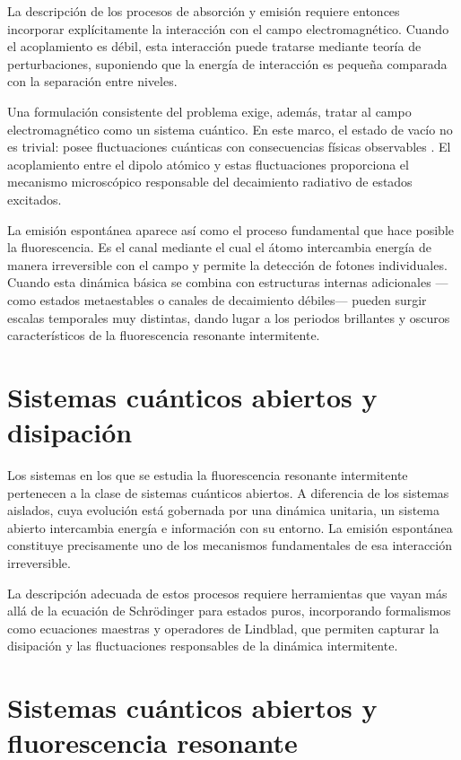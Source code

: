 \documentclass[11pt]{report}
\begin{document}
La descripción de los procesos de absorción y emisión requiere entonces incorporar explícitamente la interacción con el campo electromagnético. Cuando el acoplamiento es débil, esta interacción puede tratarse mediante teoría de perturbaciones, suponiendo que la energía de interacción es pequeña comparada con la separación entre niveles.

Una formulación consistente del problema exige, además, tratar al campo electromagnético como un sistema cuántico. En este marco, el estado de vacío no es trivial: posee fluctuaciones cuánticas con consecuencias físicas observables \cite{GlauberNobel}. El acoplamiento entre el dipolo atómico y estas fluctuaciones proporciona el mecanismo microscópico responsable del decaimiento radiativo de estados excitados.

La emisión espontánea aparece así como el proceso fundamental que hace posible la fluorescencia. Es el canal mediante el cual el átomo intercambia energía de manera irreversible con el campo y permite la detección de fotones individuales. Cuando esta dinámica básica se combina con estructuras internas adicionales —como estados metaestables o canales de decaimiento débiles— pueden surgir escalas temporales muy distintas, dando lugar a los periodos brillantes y oscuros característicos de la fluorescencia resonante intermitente.

\section{Sistemas cuánticos abiertos y disipación}

Los sistemas en los que se estudia la fluorescencia resonante intermitente pertenecen a la clase de sistemas cuánticos abiertos. A diferencia de los sistemas aislados, cuya evolución está gobernada por una dinámica unitaria, un sistema abierto intercambia energía e información con su entorno. La emisión espontánea constituye precisamente uno de los mecanismos fundamentales de esa interacción irreversible.

La descripción adecuada de estos procesos requiere herramientas que vayan más allá de la ecuación de Schrödinger para estados puros, incorporando formalismos como ecuaciones maestras y operadores de Lindblad, que permiten capturar la disipación y las fluctuaciones responsables de la dinámica intermitente.


\section{Sistemas cuánticos abiertos y fluorescencia resonante}
\end{document}
